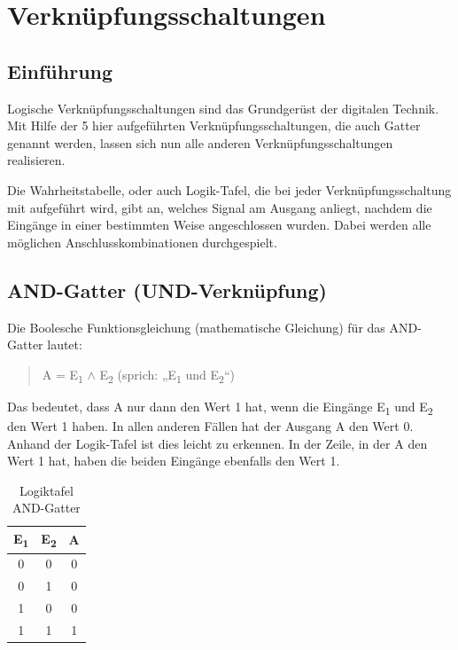 \chapter{Verknüpfungsschaltungen}

\section{Einführung}

Logische Verknüpfungsschaltungen sind das Grundgerüst der digitalen Technik. Mit Hilfe der 5 hier aufgeführten Verknüpfungsschaltungen, die auch Gatter genannt werden, lassen sich nun alle anderen Verknüpfungsschaltungen realisieren.

Die Wahrheitstabelle, oder auch Logik-Tafel, die bei jeder Verknüpfungsschaltung mit aufgeführt wird, gibt an, welches Signal am Ausgang anliegt, nachdem die Eingänge in einer bestimmten Weise angeschlossen wurden. Dabei werden alle möglichen Anschlusskombinationen durchgespielt.

\section{AND-Gatter (UND-Verknüpfung)}

Die Boolesche Funktionsgleichung (mathematische Gleichung) für das AND-Gatter lautet:

\begin{quote}
  A = E\textsubscript{1} \ensuremath{\wedge} E\textsubscript{2}  (sprich: „E\textsubscript{1} und E\textsubscript{2}“)
\end{quote}


Das bedeutet, dass A nur dann den Wert 1 hat, wenn die Eingänge E\textsubscript{1} und E\textsubscript{2} den Wert 1 haben. In allen anderen Fällen hat der Ausgang A den Wert 0. Anhand der Logik-Tafel ist dies leicht zu erkennen. In der Zeile, in der A den Wert 1 hat, haben die beiden Eingänge ebenfalls den Wert 1.

\begin{table}[htbp]
  \centering
  \caption{Logiktafel AND-Gatter}
  \begin{tabular}{ccc}
    \toprule
    E\textsubscript{1} & E\textsubscript{2} & A \\
    \midrule
    0 & 0 & 0 \\
    0 & 1 & 0 \\
    1 & 0 & 0 \\
    1 & 1 & 1 \\
    \bottomrule
  \end{tabular}
\end{table}

